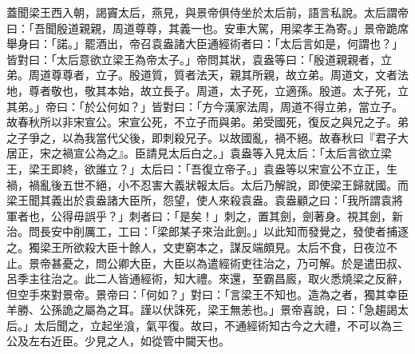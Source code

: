 \begin{pinyinscope}
蓋聞梁王西入朝，謁竇太后，燕見，與景帝俱侍坐於太后前，語言私說。太后謂帝曰：「吾聞殷道親親，周道尊尊，其義一也。安車大駕，用梁孝王為寄。」景帝跪席舉身曰：「諾。」罷酒出，帝召袁盎諸大臣通經術者曰：「太后言如是，何謂也？」皆對曰：「太后意欲立梁王為帝太子。」帝問其狀，袁盎等曰：「殷道親親者，立弟。周道尊尊者，立子。殷道質，質者法天，親其所親，故立弟。周道文，文者法地，尊者敬也，敬其本始，故立長子。周道，太子死，立適孫。殷道。太子死，立其弟。」帝曰：「於公何如？」皆對曰：「方今漢家法周，周道不得立弟，當立子。故春秋所以非宋宣公。宋宣公死，不立子而與弟。弟受國死，復反之與兄之子。弟之子爭之，以為我當代父後，即刺殺兄子。以故國亂，禍不絕。故春秋曰『君子大居正，宋之禍宣公為之』。臣請見太后白之。」袁盎等入見太后：「太后言欲立梁王，梁王即終，欲誰立？」太后曰：「吾復立帝子。」袁盎等以宋宣公不立正，生禍，禍亂後五世不絕，小不忍害大義狀報太后。太后乃解說，即使梁王歸就國。而梁王聞其義出於袁盎諸大臣所，怨望，使人來殺袁盎。袁盎顧之曰：「我所謂袁將軍者也，公得毋誤乎？」刺者曰：「是矣！」刺之，置其劍，劍著身。視其劍，新治。問長安中削厲工，工曰：「梁郎某子來治此劍。」以此知而發覺之，發使者捕逐之。獨梁王所欲殺大臣十餘人，文吏窮本之，謀反端頗見。太后不食，日夜泣不止。景帝甚憂之，問公卿大臣，大臣以為遣經術吏往治之，乃可解。於是遣田叔、呂季主往治之。此二人皆通經術，知大禮。來還，至霸昌廄，取火悉燒梁之反辭，但空手來對景帝。景帝曰：「何如？」對曰：「言梁王不知也。造為之者，獨其幸臣羊勝、公孫詭之屬為之耳。謹以伏誅死，梁王無恙也。」景帝喜說，曰：「急趨謁太后。」太后聞之，立起坐湌，氣平復。故曰，不通經術知古今之大禮，不可以為三公及左右近臣。少見之人，如從管中闚天也。


\end{pinyinscope}